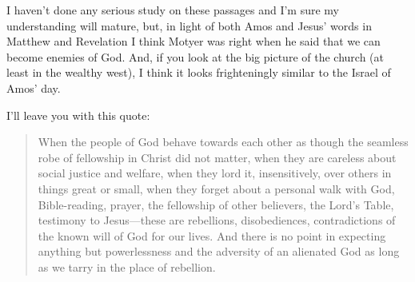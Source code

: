 I haven't done any serious study on these passages and I'm sure my understanding
will mature, but, in light of both Amos and Jesus' words in Matthew and
Revelation I think Motyer was right when he said that we can become enemies of
God. And, if you look at the big picture of the church (at least in the wealthy
west), I think it looks frighteningly similar to the Israel of Amos' day.

I'll leave you with this quote:

\begin{quote}
    When the people of God behave towards each other as though the seamless robe
    of fellowship in Christ did not matter, when they are careless about social
    justice and welfare, when they lord it, insensitively, over others in things
    great or small, when they forget about a personal walk with God,
    Bible-reading, prayer, the fellowship of other believers, the Lord's Table,
    testimony to Jesus---these are rebellions, disobediences, contradictions of
    the known will of God for our lives. And there is no point in expecting
    anything but powerlessness and the adversity of an alienated God as long as
    we tarry in the place of rebellion.
    \autocite[85]{motyer:2011}
\end{quote}



